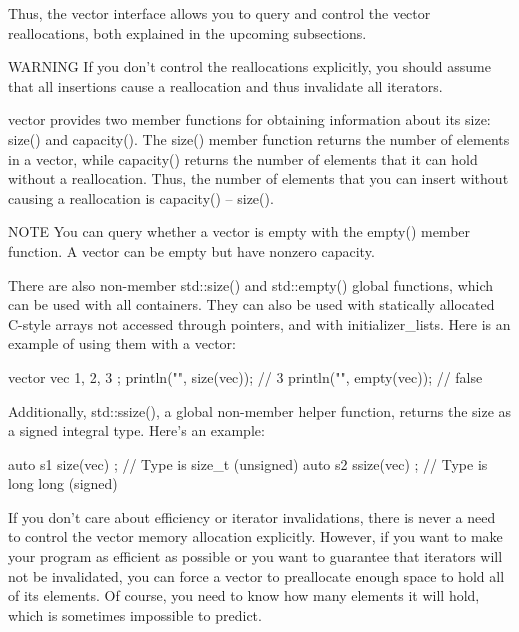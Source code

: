 Thus, the vector interface allows you to query and control the vector reallocations, both explained in the upcoming subsections.

\begin{myWarning}{WARNING}
If you don’t control the reallocations explicitly, you should assume that all insertions cause a reallocation and thus invalidate all iterators.
\end{myWarning}


vector provides two member functions for obtaining information about its size: size() and capacity(). The size() member function returns the number of elements in a vector, while capacity() returns the number of elements that it can hold without a reallocation. Thus, the number of elements that you can insert without causing a reallocation is capacity() – size().

\begin{myNotic}{NOTE}
You can query whether a vector is empty with the empty() member function. A vector can be empty but have nonzero capacity.
\end{myNotic}

There are also non-member std::size() and std::empty() global functions, which can be used with all containers. They can also be used with statically allocated C-style arrays not accessed through pointers, and with initializer\_lists. Here is an example of using them with a vector:

\begin{cpp}
vector vec { 1, 2, 3 };
println("{}", size(vec)); // 3
println("{}", empty(vec)); // false
\end{cpp}

Additionally, std::ssize(), a global non-member helper function, returns the size as a signed integral type. Here’s an example:

\begin{cpp}
auto s1 { size(vec) }; // Type is size_t (unsigned)
auto s2 { ssize(vec) }; // Type is long long (signed)
\end{cpp}


If you don’t care about efficiency or iterator invalidations, there is never a need to control the vector memory allocation explicitly. However, if you want to make your program as efficient as possible or you want to guarantee that iterators will not be invalidated, you can force a vector to preallocate enough space to hold all of its elements. Of course, you need to know how many elements it will hold, which is sometimes impossible to predict.

